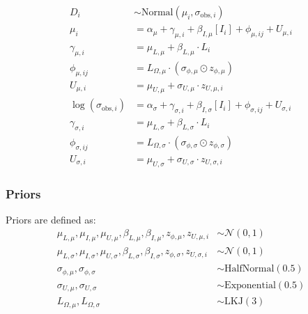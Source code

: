 \begin{align}
    D_i &\sim \text{Normal}(\mu_i, \sigma_{\text{obs},i}) \label{eq:distance_model_2_likelihood} \\
    \mu_i &= \alpha_{\mu} + \gamma_{\mu,i} + \beta_{I,\mu}[I_i] + \phi_{\mu,ij} + U_{\mu,i} \label{eq:distance_model_2_mu} \\
    \gamma_{\mu,i} &= \mu_{L,\mu} + \beta_{L,\mu} \cdot L_i \label{eq:distance_model_2_gamma_mu} \\
    \phi_{\mu,ij} &= L_{\Omega,\mu} \cdot (\sigma_{\phi,\mu} \odot z_{\phi,\mu}) \label{eq:distance_model_2_phi_mu} \\
    U_{\mu,i} &= \mu_{U,\mu} + \sigma_{U,\mu} \cdot z_{U,\mu,i} \label{eq:distance_model_2_user_mu} \\
    \log(\sigma_{\text{obs},i}) &= \alpha_{\sigma} + \gamma_{\sigma,i} + \beta_{I,\sigma}[I_i] + \phi_{\sigma,ij} + U_{\sigma,i} \label{eq:distance_model_2_sigma} \\
    \gamma_{\sigma,i} &= \mu_{L,\sigma} + \beta_{L,\sigma} \cdot L_i \label{eq:distance_model_2_gamma_sigma} \\
    \phi_{\sigma,ij} &= L_{\Omega,\sigma} \cdot (\sigma_{\phi,\sigma} \odot z_{\phi,\sigma}) \label{eq:distance_model_2_phi_sigma} \\
    U_{\sigma,i} &= \mu_{U,\sigma} + \sigma_{U,\sigma} \cdot z_{U,\sigma,i} \label{eq:distance_model_2_user_sigma}
\end{align}

\subsubsection{Priors}
Priors are defined as:
\begin{align}
    \mu_{L,\mu}, \mu_{I,\mu}, \mu_{U,\mu}, \beta_{L,\mu}, \beta_{I,\mu}, z_{\phi,\mu}, z_{U,\mu,i} &\sim \mathcal{N}(0, 1) \label{eq:priors_distance_model_2_mean} \\
    \mu_{L,\sigma}, \mu_{I,\sigma}, \mu_{U,\sigma}, \beta_{L,\sigma}, \beta_{I,\sigma}, z_{\phi,\sigma}, z_{U,\sigma,i} &\sim \mathcal{N}(0, 1) \label{eq:priors_distance_model_2_variance} \\
    \sigma_{\phi,\mu}, \sigma_{\phi,\sigma} &\sim \text{HalfNormal}(0.5) \label{eq:priors_sigma_phi_distance_model_2} \\
    \sigma_{U,\mu}, \sigma_{U,\sigma} &\sim \text{Exponential}(0.5) \label{eq:priors_sigma_U_distance_model_2} \\
    L_{\Omega,\mu}, L_{\Omega,\sigma} &\sim \text{LKJ}(3) \label{eq:priors_L_Omega_distance_model_2}
\end{align}


